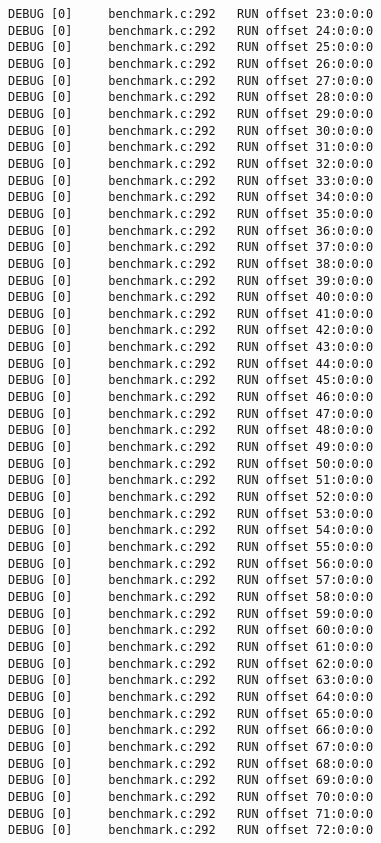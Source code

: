 \begin{verbatim}
DEBUG [0]     benchmark.c:292   RUN offset 23:0:0:0
DEBUG [0]     benchmark.c:292   RUN offset 24:0:0:0
DEBUG [0]     benchmark.c:292   RUN offset 25:0:0:0
DEBUG [0]     benchmark.c:292   RUN offset 26:0:0:0
DEBUG [0]     benchmark.c:292   RUN offset 27:0:0:0
DEBUG [0]     benchmark.c:292   RUN offset 28:0:0:0
DEBUG [0]     benchmark.c:292   RUN offset 29:0:0:0
DEBUG [0]     benchmark.c:292   RUN offset 30:0:0:0
DEBUG [0]     benchmark.c:292   RUN offset 31:0:0:0
DEBUG [0]     benchmark.c:292   RUN offset 32:0:0:0
DEBUG [0]     benchmark.c:292   RUN offset 33:0:0:0
DEBUG [0]     benchmark.c:292   RUN offset 34:0:0:0
DEBUG [0]     benchmark.c:292   RUN offset 35:0:0:0
DEBUG [0]     benchmark.c:292   RUN offset 36:0:0:0
DEBUG [0]     benchmark.c:292   RUN offset 37:0:0:0
DEBUG [0]     benchmark.c:292   RUN offset 38:0:0:0
DEBUG [0]     benchmark.c:292   RUN offset 39:0:0:0
DEBUG [0]     benchmark.c:292   RUN offset 40:0:0:0
DEBUG [0]     benchmark.c:292   RUN offset 41:0:0:0
DEBUG [0]     benchmark.c:292   RUN offset 42:0:0:0
DEBUG [0]     benchmark.c:292   RUN offset 43:0:0:0
DEBUG [0]     benchmark.c:292   RUN offset 44:0:0:0
DEBUG [0]     benchmark.c:292   RUN offset 45:0:0:0
DEBUG [0]     benchmark.c:292   RUN offset 46:0:0:0
DEBUG [0]     benchmark.c:292   RUN offset 47:0:0:0
DEBUG [0]     benchmark.c:292   RUN offset 48:0:0:0
DEBUG [0]     benchmark.c:292   RUN offset 49:0:0:0
DEBUG [0]     benchmark.c:292   RUN offset 50:0:0:0
DEBUG [0]     benchmark.c:292   RUN offset 51:0:0:0
DEBUG [0]     benchmark.c:292   RUN offset 52:0:0:0
DEBUG [0]     benchmark.c:292   RUN offset 53:0:0:0
DEBUG [0]     benchmark.c:292   RUN offset 54:0:0:0
DEBUG [0]     benchmark.c:292   RUN offset 55:0:0:0
DEBUG [0]     benchmark.c:292   RUN offset 56:0:0:0
DEBUG [0]     benchmark.c:292   RUN offset 57:0:0:0
DEBUG [0]     benchmark.c:292   RUN offset 58:0:0:0
DEBUG [0]     benchmark.c:292   RUN offset 59:0:0:0
DEBUG [0]     benchmark.c:292   RUN offset 60:0:0:0
DEBUG [0]     benchmark.c:292   RUN offset 61:0:0:0
DEBUG [0]     benchmark.c:292   RUN offset 62:0:0:0
DEBUG [0]     benchmark.c:292   RUN offset 63:0:0:0
DEBUG [0]     benchmark.c:292   RUN offset 64:0:0:0
DEBUG [0]     benchmark.c:292   RUN offset 65:0:0:0
DEBUG [0]     benchmark.c:292   RUN offset 66:0:0:0
DEBUG [0]     benchmark.c:292   RUN offset 67:0:0:0
DEBUG [0]     benchmark.c:292   RUN offset 68:0:0:0
DEBUG [0]     benchmark.c:292   RUN offset 69:0:0:0
DEBUG [0]     benchmark.c:292   RUN offset 70:0:0:0
DEBUG [0]     benchmark.c:292   RUN offset 71:0:0:0
DEBUG [0]     benchmark.c:292   RUN offset 72:0:0:0

\end{verbatim}

